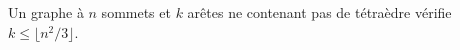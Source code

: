 Un graphe à $n$ sommets et $k$ arêtes ne contenant pas de tétraèdre vérifie $k \leq \lfloor n^2/3 \rfloor$.
